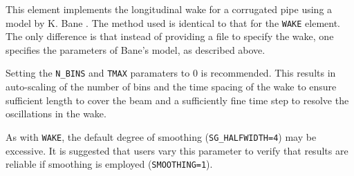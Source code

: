 This element implements the longitudinal wake for a corrugated pipe
using a model by K. Bane \cite{Bane-SLAC14925}.
The method used is identical to that for the \verb|WAKE| element.
The only difference is that instead of providing a file to specify the
wake, one specifies the parameters of Bane's model, as described above.

Setting the {\tt N\_BINS} and {\tt TMAX} paramaters to 0 is recommended.  This results
in auto-scaling of the number of bins and the time spacing of the wake to ensure
sufficient length to cover the beam and a sufficiently fine time step to resolve
the oscillations in the wake.

As with \verb|WAKE|, the default degree of smoothing ({\tt SG\_HALFWIDTH=4}) may be excessive.
It is suggested that users vary this parameter to verify that results
are reliable if smoothing is employed ({\tt SMOOTHING=1}).

